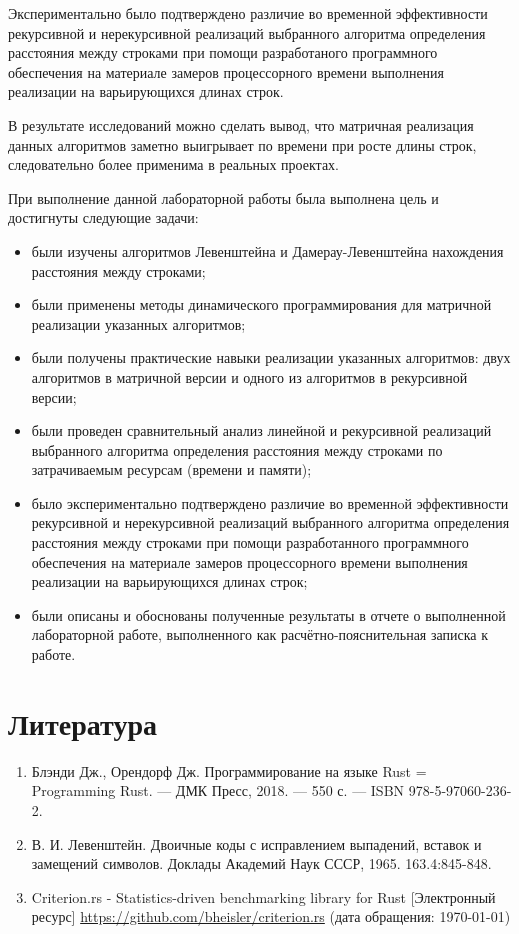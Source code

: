 \documentclass[14pt,russian]{scrartcl}
\newcommand{\anonsection}[1]{\cleardoublepage
\phantomsection
\addcontentsline{toc}{section}{\protect\numberline{}#1}
\section*{#1}\vspace*{2.5ex} %
}
\begin{document}
	Экспериментально было подтверждено различие во временной эффективности рекурсивной и нерекурсивной реализаций выбранного алгоритма определения расстояния между строками при помощи разработаного программного обеспечения на материале замеров процессорного времени выполнения реализации на варьирующихся длинах строк. 
	\newline

	В результате исследований можно сделать вывод, что матричная реализация данных алгоритмов заметно выигрывает по времени при росте длины строк, следовательно более применима в реальных проектах.
	\newline
	
	При выполнение данной лабораторной работы была выполнена цель и достигнуты следующие задачи:

	\begin{itemize}
		\item были изучены алгоритмов Левенштейна и Дамерау-Левенштейна нахождения расстояния между строками;
		\item были применены методы динамического программирования для матричной реализации указанных алгоритмов;
		\item были получены практические навыки реализации указанных алгоритмов: двух алгоритмов в матричной версии и одного из алгоритмов в рекурсивной версии;
		\item были проведен сравнительный анализ линейной и рекурсивной реализаций выбранного алгоритма определения расстояния между строками по затрачиваемым ресурсам (времени и памяти);
		\item было экспериментально подтверждено различие во временнoй эффективности рекурсивной и нерекурсивной реализаций выбранного алгоритма определения расстояния между строками при помощи разработанного программного обеспечения на материале замеров процессорного времени выполнения реализации на варьирующихся длинах строк;
		\item были описаны и обоснованы полученные результаты в отчете о выполненной лабораторной работе, выполненного как расчётно-пояснительная записка к работе.
	\end{itemize}

	\anonsection{Литература}

	\begin{enumerate}
		\item Блэнди Дж., Орендорф Дж. Программирование на языке Rust = Programming Rust. — ДМК Пресс, 2018. — 550 с. — ISBN 978-5-97060-236-2.
		\item В. И. Левенштейн. Двоичные коды с исправлением выпадений, вставок и замещений символов. Доклады Академий Наук СССР, 1965. 163.4:845-848.
		\item Criterion.rs - Statistics-driven benchmarking library for Rust [Электронный ресурс] \url{https://github.com/bheisler/criterion.rs} (дата обращения: \today)
	\end{enumerate}
\end{document}
